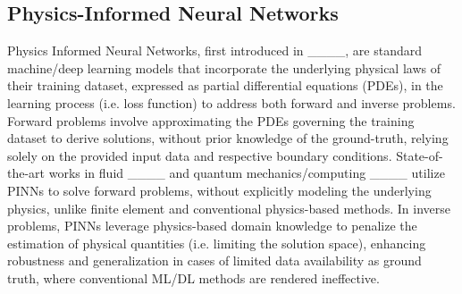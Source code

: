 
\subsection{Physics-Informed Neural Networks}

Physics Informed Neural Networks, first introduced in ____, are standard machine/deep learning models that incorporate the underlying physical laws of their training dataset, expressed as partial differential equations (PDEs), in the learning process (i.e. loss function) to address both forward and inverse problems. Forward problems involve approximating the PDEs governing the training dataset to derive solutions, without prior knowledge of the ground-truth, relying solely on the provided input data and respective boundary conditions. State-of-the-art works in fluid ____ and quantum mechanics/computing ____ utilize PINNs to solve forward problems, without explicitly modeling the underlying physics, unlike finite element and conventional physics-based methods. In inverse problems, PINNs leverage physics-based domain knowledge to penalize the estimation of physical quantities (i.e. limiting the solution space), enhancing robustness and generalization in cases of limited data availability as ground truth, where conventional ML/DL methods are rendered ineffective. 

